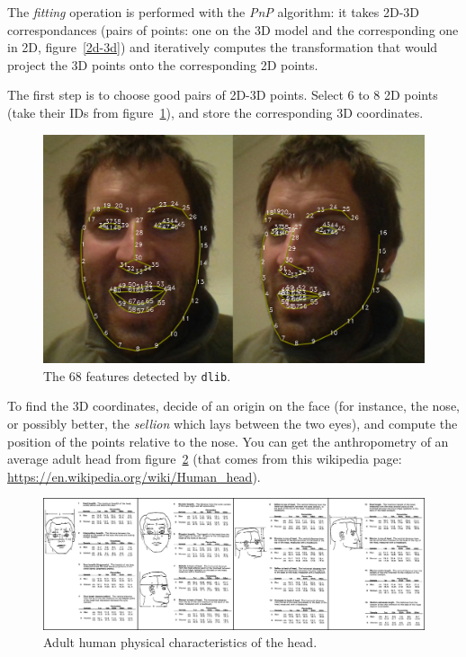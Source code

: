 \documentclass{instructions}
\begin{document}
The \emph{fitting} operation is performed with the \emph{PnP} algorithm: it
takes 2D-3D correspondances (pairs of points: one on the 3D model and the
corresponding one in 2D, figure~\ref{2d-3d}) and iteratively computes the transformation that would
project the 3D points onto the corresponding 2D points.




The first step is to choose good pairs of 2D-3D points. Select 6 to 8 2D points
(take their IDs from figure~\ref{dlib-features}), and store the corresponding 3D
coordinates.

\begin{figure}[h!]
    \centering
    \includegraphics[width=0.9\linewidth]{figs/dlib-features}
    \caption{The 68 features detected by {\tt dlib}.}
    \label{dlib-features}
\end{figure}

To find the 3D coordinates, decide of an origin on the face (for instance, the
nose, or possibly better, the \emph{sellion} which lays between the two eyes),
and compute the position of the points relative to the nose. You can get the
anthropometry of an average adult head from figure~\ref{head} (that comes from
this wikipedia page: \url{https://en.wikipedia.org/wiki/Human_head}).

\begin{figure}[h!]
    \centering
    \includegraphics[width=1.\linewidth]{figs/headanthropometry}
    \caption{Adult human physical characteristics of the head.}
    \label{head}
\end{figure}
\end{document}
